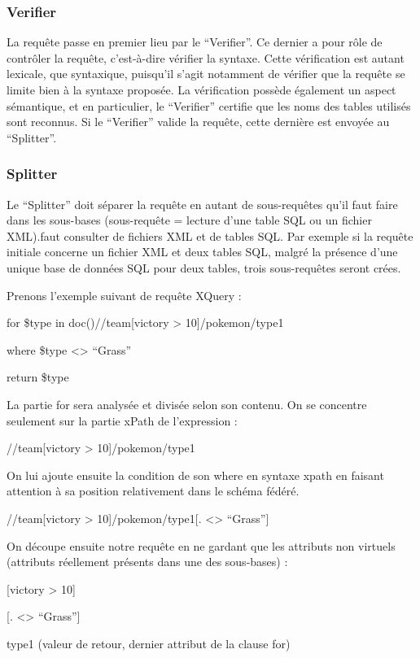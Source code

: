 \subsubsection{Verifier}

La requête passe en premier lieu par le “Verifier”. Ce dernier a pour rôle de contrôler la requête, c’est-à-dire vérifier la syntaxe. Cette vérification est autant lexicale, que syntaxique, puisqu’il s’agit notamment de vérifier que la requête se limite bien à la syntaxe proposée. La vérification possède également un aspect sémantique, et en particulier, le “Verifier” certifie que les noms des tables utilisés sont reconnus. Si le “Verifier” valide la requête, cette dernière est envoyée au “Splitter”.

\subsubsection{Splitter}

Le “Splitter” doit séparer la requête en autant de sous-requêtes qu’il faut faire dans les sous-bases (sous-requête = lecture d'une table SQL ou un fichier XML).faut consulter de fichiers XML et de tables SQL. Par exemple si la requête initiale concerne un fichier XML et deux tables SQL, malgré la présence d’une unique base de données SQL pour deux tables, trois sous-requêtes seront crées.

Prenons l’exemple suivant de requête XQuery :

for \$type in doc()//team[victory > 10]/pokemon/type1

where \$type <> “Grass”

return \$type

La partie for sera analysée et divisée selon son contenu. On se concentre seulement sur la partie xPath de l’expression :

//team[victory > 10]/pokemon/type1

On lui ajoute ensuite la condition de son where en syntaxe xpath en faisant attention à sa position relativement dans le schéma fédéré.

//team[victory > 10]/pokemon/type1[. <> “Grass”]

On découpe ensuite notre requête en ne gardant que les attributs non virtuels (attributs réellement présents dans une des sous-bases) :


[victory > 10]


[. <> “Grass”]


type1 (valeur de retour, dernier attribut de la clause for)

